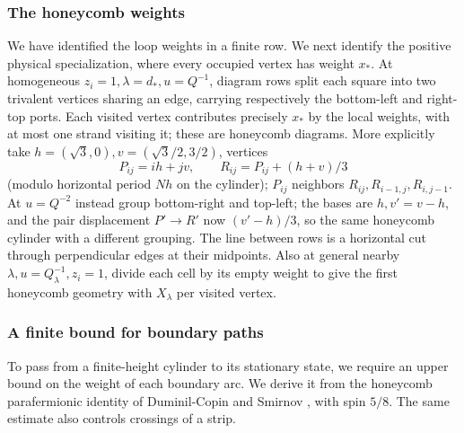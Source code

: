 \subsubsection{The honeycomb weights}

We have identified the loop weights in a finite row. We next identify the
positive physical specialization, where every occupied vertex has weight
$x_*$. At homogeneous \(z_i=1,\lambda=d_*,u=Q^{-1}\), diagram rows split each square into two trivalent vertices sharing an edge, carrying respectively the bottom-left and right-top ports. Each visited vertex contributes precisely \(x_*\) by the local weights, with at most one strand visiting it; these are honeycomb diagrams. More explicitly take \(h=(\sqrt3,0), v=(\sqrt3/2,3/2)\), vertices
\[
 P_{ij}=ih+jv,\qquad R_{ij}=P_{ij}+(h+v)/3
\]
(modulo horizontal period \(Nh\) on the cylinder); \(P_{ij}\) neighbors \(R_{ij},R_{i-1,j},R_{i,j-1}\). At \(u=Q^{-2}\) instead group bottom-right and top-left; the bases are \(h,v'=v-h\), and the pair displacement \(P'\to R'\) now \((v'-h)/3\), so the same honeycomb cylinder with a different grouping. The line between rows is a horizontal cut through perpendicular edges at their midpoints. Also at general nearby \(\lambda,u=Q_\lambda^{-1},z_i=1\), divide each cell by its empty weight to give the first honeycomb geometry with \(X_\lambda\) per visited vertex.

\subsubsection{A finite bound for boundary paths}

To pass from a finite-height cylinder to its stationary state, we require
an upper bound on the weight of each boundary arc. We derive it from the
honeycomb parafermionic identity of Duminil-Copin and Smirnov
\cite{DuminilCopinSmirnov2012}, with spin $5/8$. The same estimate also
controls crossings of a strip.

